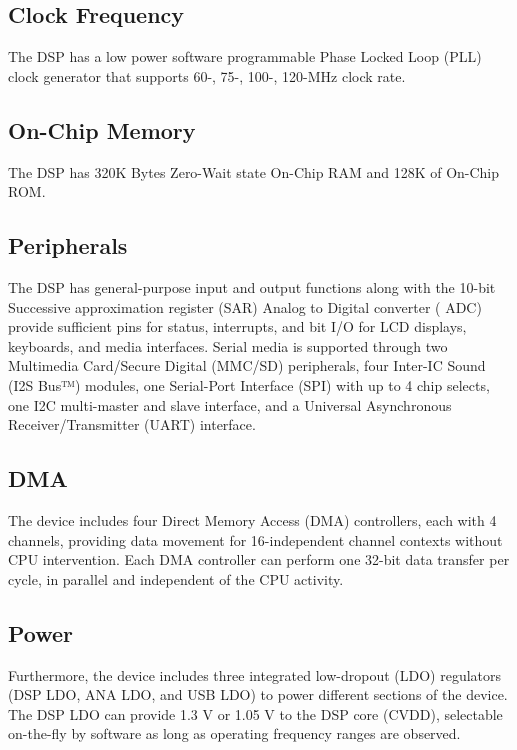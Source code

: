 \subsection{Clock Frequency}The DSP has a low power software programmable Phase Locked Loop (PLL) clock generator that supports 60-, 75-, 100-, 120-MHz clock rate.
\subsection{On-Chip Memory}The DSP has 320K Bytes Zero-Wait state On-Chip RAM and 128K of On-Chip ROM. 

\subsection{Peripherals} The DSP has general-purpose input and output functions along with the 10-bit Successive approximation register (SAR) Analog to Digital converter ( ADC) provide sufficient pins for status, interrupts, and bit I/O for LCD displays, keyboards, and media interfaces. Serial media is supported through two Multimedia Card/Secure Digital (MMC/SD) peripherals, four Inter-IC Sound (I2S Bus™) modules, one Serial-Port Interface (SPI) with up to 4 chip selects, one I2C multi-master and slave interface, and a Universal Asynchronous Receiver/Transmitter (UART) interface. 

\subsection{DMA} The device includes four Direct Memory Access (DMA) controllers, each with 4 channels, providing data movement for 16-independent channel contexts without CPU intervention. Each DMA controller can perform one 32-bit data transfer per cycle, in parallel and independent of the CPU activity.


\subsection{Power} Furthermore, the device includes three integrated low-dropout (LDO) regulators (DSP LDO, ANA LDO, and USB LDO) to power different sections of the device. The DSP LDO can provide 1.3 V or 1.05 V to the DSP core (CVDD), selectable on-the-fly by software as long as operating frequency ranges are observed. 



